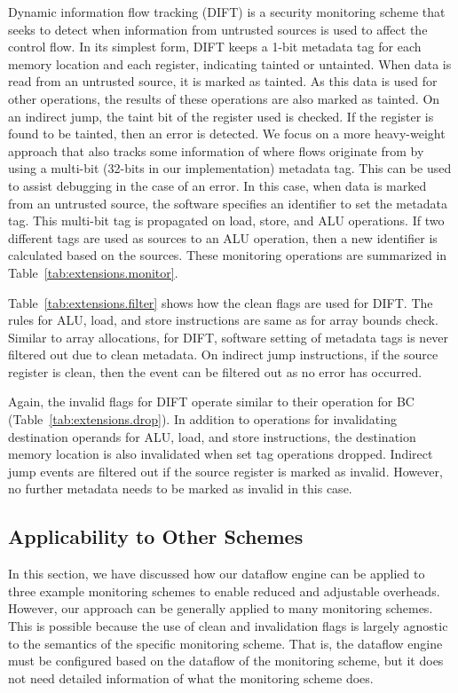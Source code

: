 Dynamic information flow tracking (DIFT) \cite{dift-asplos04} is a security
monitoring scheme that seeks to detect when information from untrusted sources
is used to affect the control flow.  In its simplest form, DIFT keeps a 1-bit
metadata tag for each memory location and each register, indicating tainted or
untainted. When data is read from an untrusted source, it is marked as tainted.
As this data is used for other operations, the results of these operations are
also marked as tainted. On an indirect jump, the taint bit of the register used
is checked. If the register is found to be tainted, then an error is detected.
We focus on a more heavy-weight approach that also tracks some information of
where flows originate from by using a multi-bit (32-bits in our implementation)
metadata tag. This can be used to assist debugging in the case of an error. In
this case, when data is marked from an untrusted source, the software specifies
an identifier to set the metadata tag. This multi-bit tag is propagated on
load, store, and ALU operations. If two different tags are used as sources to
an ALU operation, then a new identifier is calculated based on the sources.
These monitoring operations are summarized in
Table~\ref{tab:extensions.monitor}.

Table~\ref{tab:extensions.filter} shows how the clean flags are used for DIFT.
The rules for ALU, load, and store instructions are same as for array bounds
check. Similar to array allocations, for DIFT, software setting of metadata
tags is never filtered out due to clean metadata. On indirect jump
instructions, if the source register is clean, then the event can be filtered
out as no error has occurred.

Again, the invalid flags for DIFT operate similar to their operation for BC
(Table~\ref{tab:extensions.drop}). In addition to operations for invalidating
destination operands for ALU, load, and store instructions, the destination
memory location is also invalidated when set tag operations dropped. Indirect
jump events are filtered out if the source register is marked as invalid.
However, no further metadata needs to be marked as invalid in this case.

\subsection{Applicability to Other Schemes}

In this section, we have discussed how our dataflow engine can be applied to
three example monitoring schemes to enable reduced and adjustable overheads.
However, our approach can be generally applied to many monitoring schemes. This
is possible because the use of clean and invalidation flags is largely agnostic
to the semantics of the specific monitoring scheme. That is, the dataflow
engine must be configured based on the dataflow of the monitoring scheme, but
it does not need detailed information of what the monitoring scheme does. 

